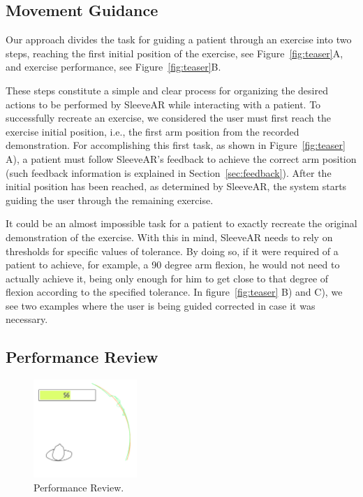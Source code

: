 \subsection{Movement Guidance}
Our approach divides the task for guiding a patient through
an exercise into two steps, reaching the first
initial position of  the  exercise, see  Figure~\ref{fig:teaser}A,  and exercise performance, see  Figure~\ref{fig:teaser}B. 

These steps constitute a simple and clear process for organizing the desired actions to be performed by SleeveAR while interacting with a patient.
To successfully recreate an exercise, we considered the user must first reach the exercise initial position, i.e., the first arm position from the recorded demonstration.
For accomplishing this first task, as shown in Figure~\ref{fig:teaser} A), a patient must follow SleeveAR's feedback to achieve the correct arm position (such feedback information is explained in Section~\ref{sec:feedback}).
After the initial position has been reached, as determined by SleeveAR, the system starts guiding the user through the remaining exercise.

It could be an almost impossible task for a patient to exactly recreate the original demonstration of the exercise. 
With this in mind, SleeveAR needs to rely on thresholds for specific values of tolerance. 
By doing so, if it were required of a patient to achieve, for example, a 90 degree arm flexion, he would not 
need to actually achieve it, being only enough for him to get close to that degree of flexion according to the specified tolerance.
In figure~\ref{fig:teaser} B) and C), we see two examples where the user is being guided corrected in case it was necessary.


\subsection{Performance Review}

\begin{figure}
    \begin{center}
        \includegraphics[width=0.35\textwidth]{imgs/approach/performancereview}
    \end{center}
    \caption{Performance Review.}
    \label{fig:performancereview}
\end{figure}

